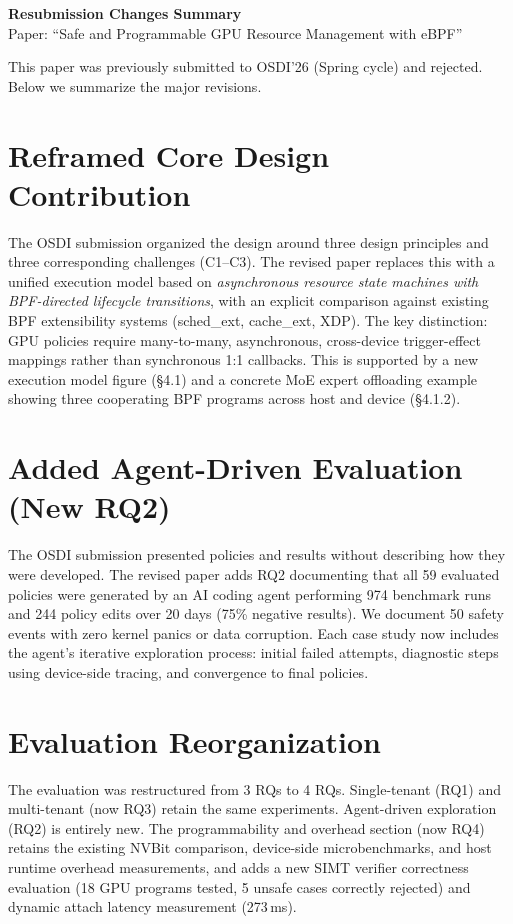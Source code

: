 \documentclass[10pt]{article}
\begin{document}
\begin{center}
{\large \textbf{Resubmission Changes Summary}}\\[0.3em]
{\small Paper: ``Safe and Programmable GPU Resource Management with eBPF''}
\end{center}

\smallskip

This paper was previously submitted to OSDI'26 (Spring cycle) and rejected. Below we summarize the major revisions.

\section{Reframed Core Design Contribution}

The OSDI submission organized the design around three design principles and three corresponding challenges (C1--C3). The revised paper replaces this with a unified execution model based on \emph{asynchronous resource state machines with BPF-directed lifecycle transitions}, with an explicit comparison against existing BPF extensibility systems (sched\_ext, cache\_ext, XDP). The key distinction: GPU policies require many-to-many, asynchronous, cross-device trigger-effect mappings rather than synchronous 1:1 callbacks. This is supported by a new execution model figure (\S4.1) and a concrete MoE expert offloading example showing three cooperating BPF programs across host and device (\S4.1.2).

\section{Added Agent-Driven Evaluation (New RQ2)}

The OSDI submission presented policies and results without describing how they were developed. The revised paper adds RQ2 documenting that all 59 evaluated policies were generated by an AI coding agent performing 974 benchmark runs and 244 policy edits over 20 days (75\% negative results). We document 50 safety events with zero kernel panics or data corruption. Each case study now includes the agent's iterative exploration process: initial failed attempts, diagnostic steps using device-side tracing, and convergence to final policies.

\section{Evaluation Reorganization}

The evaluation was restructured from 3 RQs to 4 RQs. Single-tenant (RQ1) and multi-tenant (now RQ3) retain the same experiments. Agent-driven exploration (RQ2) is entirely new. The programmability and overhead section (now RQ4) retains the existing NVBit comparison, device-side microbenchmarks, and host runtime overhead measurements, and adds a new SIMT verifier correctness evaluation (18 GPU programs tested, 5 unsafe cases correctly rejected) and dynamic attach latency measurement (273\,ms).
\end{document}
